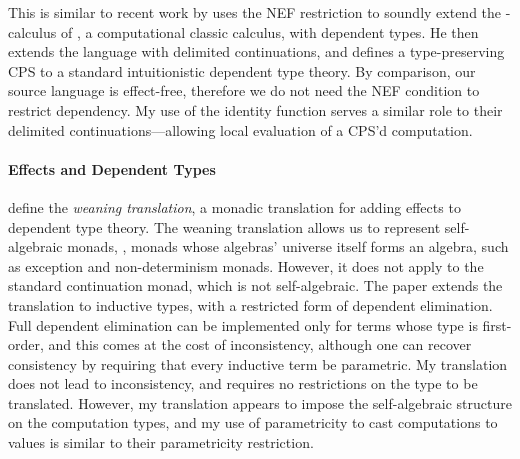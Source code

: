 This is similar to recent work by \citet{miquey2017} uses the NEF restriction to
soundly extend the \im{\bar{\lambda}\mu\tilde{\mu}}-calculus of
\citet{curien2000}, a computational classic calculus, with
dependent types.
He then extends the language with delimited continuations, and defines a
type-preserving CPS to a standard intuitionistic dependent type theory.
By comparison, our source language \cpsslang is effect-free,
therefore we do not need the NEF condition to restrict dependency.
My use of the identity function serves a similar role to their delimited
continuations---allowing local evaluation of a CPS'd computation.

\paragraph{Effects and Dependent Types}
\citet{pedrot2017:weaning} define the \emph{weaning translation}, a monadic translation for
adding effects to dependent type theory.
The weaning translation allows us to represent self-algebraic monads, \ie,
monads whose algebras' universe itself forms an algebra, such as exception and
non-determinism monads.
However, it does not apply to the standard continuation monad, which is not self-algebraic.
The paper extends the translation to inductive types, with a restricted form of
dependent elimination.
Full dependent elimination can be implemented only for terms whose type is
first-order, and this comes at the cost of inconsistency, although one can
recover consistency by requiring that every inductive term be parametric.
My translation does not lead to inconsistency, and requires no restrictions on
the type to be translated.
However, my translation appears to impose the self-algebraic structure on the
computation types, and my use of parametricity to cast computations to values is
similar to their
parametricity restriction.

